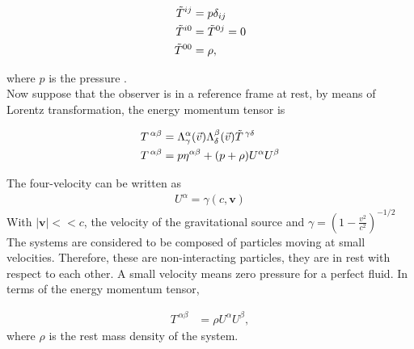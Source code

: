  \begin{align}
        \Tilde{T}^{ij}&=p\delta_{ij}\\
        \Tilde{T}^{i0}&=\Tilde{T}^{0j}=0\\
        \Tilde{T}^{00}&=\rho,
        \label{eq: Tperfectfluid}
    \end{align}
    
where $p$ is the pressure  \cite{Weinberg}.\\

Now suppose that the observer is in a reference frame at rest, by means of Lorentz transformation, the energy momentum tensor is \cite{Weinberg}

 \begin{align}
        T^{\,\alpha\beta}&= \Lambda^\alpha_\gamma(\vec{v}) \Lambda^\beta_\delta(\vec{v}) \Tilde{T}^{\,\gamma\delta} \\
        T^{\,\alpha\beta}&= p\eta^{\alpha\beta}+(p+\rho)U^{\alpha}U^{\beta}  
    \end{align}
    
The four-velocity can be written as 
 \begin{align}
        U^{\alpha} = \gamma(c, \textbf{v})
    \end{align}
 With $|\textbf{v}| << c$, the velocity of the gravitational source and $\gamma = \left(1-\frac{v^2}{c^2}\right)^{-1/2}$\\
    
The systems are considered to be composed of particles moving at small velocities. Therefore, these are non-interacting particles, they are in rest with respect to each other. A small velocity means zero pressure for a perfect fluid. In terms of the energy momentum tensor,

 \begin{align}
        T^{\,\alpha\beta}&= \rho U^{\alpha}U^{\beta},
        \label{eq:Tincoherentmatter}
    \end{align}
 where $\rho$ is the rest mass density of the system. 
 

